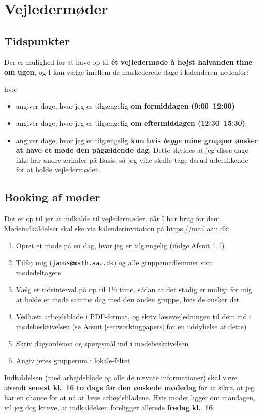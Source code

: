 \section{Vejledermøder}
\label{sec:meetings}
\subsection{Tidspunkter}
\label{subsec:times}
Der er mulighed for at have op til \textbf{\'et vejledermøde \`a højst halvanden time om ugen}, og I kan vælge imellem de markederede dage i kalenderen nedenfor:
\begin{center}
  
\end{center}
hvor
\begin{itemize}[label={},wide,labelindent=0pt,topsep=1ex]
\item {} angiver dage, hvor jeg er tilgængelig \textbf{om formiddagen (9:00--12:00)}
\item {} angiver dage, hvor jeg er tilgængelig \textbf{om eftermiddagen (12:30--15:30)}
\item {} angiver dage, hvor jeg er tilgængelig \textbf{kun hvis \emph{begge} mine grupper ønsker at have et møde den pågældende dag}.
  Dette skyldes at jeg disse dage ikke har andre ærinder på Basis, så jeg ville skulle tage derud udelukkende for at holde vejledermøder.
\end{itemize}

\clearpage
\subsection{Booking af møder}
\label{subsec:booking}
Det er op til jer at indkalde til vejledermøder, når I har brug for dem.
Mødeindkaldelser skal ske via kalenderinvitation på \url{https://mail.aau.dk}:
\begin{enumerate}[itemsep=0pt]
\item Opret et møde på en dag, hvor jeg er tilgængelig (ifølge Afsnit \ref{subsec:times})
\item Tilføj mig (\texttt{janus@math.aau.dk}) og alle gruppemedlemmer som mødedeltagere
\item Vælg et tidsinterval på op til 1½ time, sådan at det stadig er muligt for mig at holde et møde samme dag med den anden gruppe, hvis de ønsker det
\item Vedhæft arbejdsblade i PDF-format, og skriv læsevejledningen til dem ind i mødebeskrivelsen (se Afsnit \ref{sec:workingpapers} for en uddybelse af dette)
\item Skriv dagsordenen og spørgsmål ind i mødebeskrivelsen
\item Angiv jeres grupperum i lokale-feltet
\end{enumerate}
Indkaldelsen (med arbejdsblade og alle de nævnte informationer) skal være afsendt \textbf{senest kl.\ 16 to dage før den ønskede mødedag} for at sikre, at jeg har en chance for at nå at læse arbejdsbladene.
Hvis mødet ligger om mandagen, vil jeg dog kræve, at indkaldelsen foreligger allerede \textbf{fredag kl.\ 16}.

